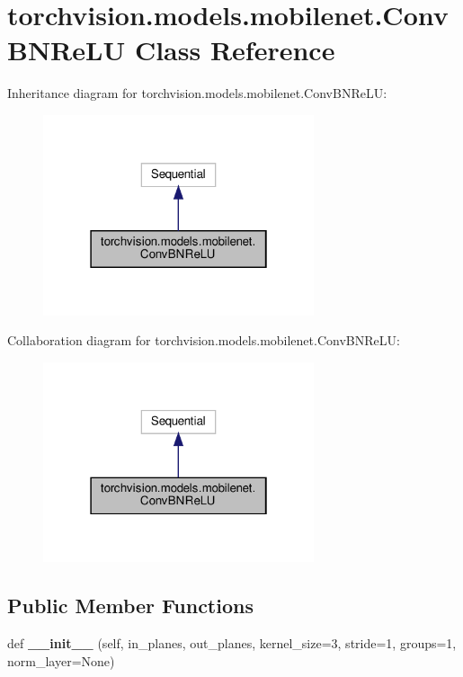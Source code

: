 \hypertarget{classtorchvision_1_1models_1_1mobilenet_1_1ConvBNReLU}{}\section{torchvision.\+models.\+mobilenet.\+Conv\+B\+N\+Re\+LU Class Reference}
\label{classtorchvision_1_1models_1_1mobilenet_1_1ConvBNReLU}


Inheritance diagram for torchvision.\+models.\+mobilenet.\+Conv\+B\+N\+Re\+LU\+:
\nopagebreak
\begin{figure}[H]
\begin{center}
\leavevmode
\includegraphics[width=226pt]{classtorchvision_1_1models_1_1mobilenet_1_1ConvBNReLU__inherit__graph}
\end{center}
\end{figure}


Collaboration diagram for torchvision.\+models.\+mobilenet.\+Conv\+B\+N\+Re\+LU\+:
\nopagebreak
\begin{figure}[H]
\begin{center}
\leavevmode
\includegraphics[width=226pt]{classtorchvision_1_1models_1_1mobilenet_1_1ConvBNReLU__coll__graph}
\end{center}
\end{figure}
\subsection*{Public Member Functions}
\begin{DoxyCompactItemize}
\item 
\mbox{\label{classtorchvision_1_1models_1_1mobilenet_1_1ConvBNReLU_a1553084df08a5ed53add27de0ce0fc7b}} 
def {\bfseries \+\_\+\+\_\+init\+\_\+\+\_\+} (self, in\+\_\+planes, out\+\_\+planes, kernel\+\_\+size=3, stride=1, groups=1, norm\+\_\+layer=None)
\end{DoxyCompactItemize}



